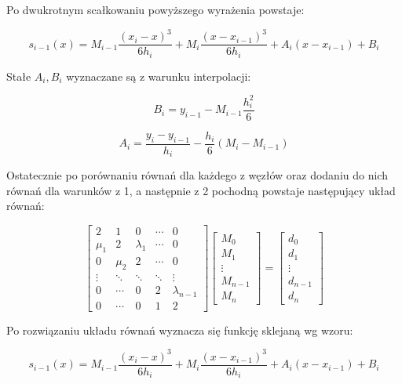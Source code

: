 \documentclass{article}
\begin{document}
\noindent
Po dwukrotnym scałkowaniu powyższego wyrażenia powstaje:

\begin{equation*}
s_{i-1}(x) = M_{i-1} \frac{(x_i - x)^3}{6h_i} + M_i \frac{(x - x_{i-1})^3}{6h_i} + A_i (x - x_{i-1}) + B_i
\end{equation*}

\noindent
Stałe $A_i, B_i$ wyznaczane są z warunku interpolacji:

\begin{equation*}
B_i = y_{i-1} - M_{i-1} \frac{h_i^2}{6}
\end{equation*}

\begin{equation*}
A_i = \frac{y_i - y_{i-1}}{h_i} - \frac{h_i}{6} (M_i - M_{i-1})
\end{equation*}

\noindent
Ostatecznie po porównaniu równań dla każdego z węzłów oraz dodaniu do nich równań dla warunków z 1, a następnie z 2 pochodną powstaje następujący układ równań:


\begin{equation*}
\begin{bmatrix}
2 & 1 & 0 & \cdots & 0 \\
\mu_1 & 2 & \lambda_1 & \cdots & 0 \\
0 & \mu_2 & 2 & \cdots & 0 \\
\vdots & \ddots & \ddots & \ddots & \vdots \\
0 & \cdots & 0 & 2 & \lambda_{n-1} \\
0 & \cdots & 0 & 1 & 2
\end{bmatrix}
\begin{bmatrix}
M_0 \\
M_1 \\
\vdots \\
M_{n-1} \\
M_n
\end{bmatrix}
=
\begin{bmatrix}
d_0 \\
d_1 \\
\vdots \\
d_{n-1} \\
d_n
\end{bmatrix}
\end{equation*}

\noindent
Po rozwiązaniu układu równań wyznacza się funkcję sklejaną wg wzoru:

\begin{equation*}
s_{i-1}(x) = M_{i-1} \frac{(x_i - x)^3}{6h_i} + M_i \frac{(x - x_{i-1})^3}{6h_i} + A_i (x - x_{i-1}) + B_i
\end{equation*}
\end{document}
